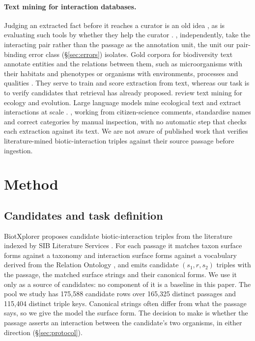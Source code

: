 \documentclass[11pt]{article}
\begin{document}
\paragraph{Text mining for interaction databases.}
Judging an extracted fact before it reaches a curator is an old idea
\citep{rodriguezesteban2006imitating}, as is evaluating such tools by whether they help the curator
\citep{hirschman2012biocuration,britan2018nexta5,lee2018scaling}. \citet{cuzick2023interspecies},
independently, take the interacting pair rather than the passage as the annotation unit, the unit
our pair-binding error class (\S\ref{sec:errors}) isolates. Gold corpora for biodiversity text
annotate entities and the relations between them, such as microorganisms with their habitats and
phenotypes \citep{bossy2019bacteria} or organisms with environments, processes and qualities
\citep{abdelmageed2022biodivnere}. They serve to train and score extraction from text, whereas our
task is to verify candidates that retrieval has already proposed. \citet{farrell2024landscape} review text mining for ecology and evolution. Large language models mine ecological text
\citep{dsouza2025mining} and extract interactions at scale
\citep{keck2025extracting,zou2026llm}. \citet{zou2026llm}, working from citizen-science comments, standardise names and correct categories
by manual inspection, with no automatic step that checks each extraction against its text. We are not aware of published work
that verifies literature-mined biotic-interaction triples against their source passage before
ingestion.

\section{Method}
\label{sec:method}

\subsection{Candidates and task definition}
\label{sec:setting}

BiotXplorer \citep{ruch2024biotxplorer} proposes candidate biotic-interaction triples from the
literature indexed by SIB Literature Services \citep{gobeill2020sibils}. For each passage it matches
taxon surface forms against a taxonomy and interaction surface forms against a vocabulary derived
from the Relation Ontology \citep{smith2005relations}, and emits candidate $(s_1, r, s_2)$ triples with the passage, the matched
surface strings and their canonical forms. We use it only as a source of candidates: no component of
it is a baseline in this paper. The pool we study has 175{,}588 candidate rows over 165{,}325
distinct passages and 115{,}404 distinct triple keys. Canonical strings often differ from what
the passage says, so we give the model the surface form. The
decision to make is whether the passage asserts an interaction between the candidate's two
organisms, in either direction (\S\ref{sec:protocol}).
\end{document}
